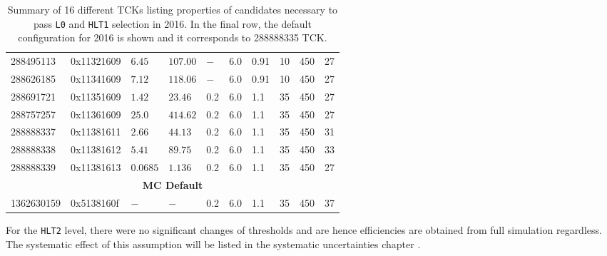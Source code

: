 \begin{table}
\begin{center}
\begin{tabular}{l l l l | l l l l | l l }
      288495113 & 0x11321609 & $6.45$ &  $107.00$   &  $-$ & 6.0 & 0.91 & 10 & 450 & 27 \\%
      288626185 & 0x11341609 & $7.12$ &  $118.06$  &  $-$ & 6.0 & 0.91 & 10 & 450 & 27 \\%
      288691721 & 0x11351609 &  $1.42$ &  $23.46$   &  0.2 & 6.0 & 1.1  & 35  & 450 & 27 \\%
      288757257 & 0x11361609 & $25.0$ &  $414.62$   &  0.2 & 6.0 & 1.1  & 35 & 450 & 27  \\%
      288888337 & 0x11381611 & $ 2.66$ &  $44.13$  &  0.2 & 6.0 & 1.1  & 35  & 450 & 31 \\%
      288888338 & 0x11381612 & $5.41$ &  $89.75$  &  0.2 & 6.0 & 1.1  & 35  & 450 & 33 \\%
      288888339 & 0x11381613 & $0.0685$ &  $1.136$  &  0.2 & 6.0 & 1.1  & 35  & 450 & 27 \\%
      \multicolumn{10}{c}{\textbf{MC Default}} \\
      1362630159 & 0x5138160f & $-$  & $-$   & 0.2 & 6.0 & 1.1  & 35 & 450 & 37\\%

   \end{tabular}
\caption{Summary of 16 different TCKs listing properties of candidates necessary to pass \texttt{L0} and \texttt{HLT1} selection in 2016. In the final row, the default configuration for 2016 is shown and it corresponds to 288888335 TCK.}
\label{tab:2016MC}
	\end{center}
\end{table}

For the \texttt{HLT2} level, there were no significant changes of thresholds and are hence efficiencies are obtained from full simulation regardless. The systematic effect of this assumption will be listed in the systematic uncertainties chapter .






